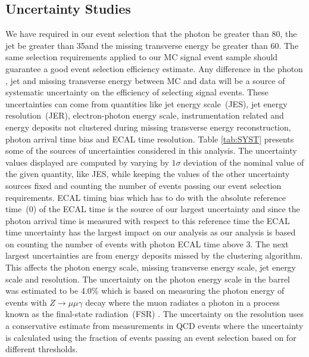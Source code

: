 \subsection{Uncertainty Studies}
We have required in our event selection that the photon \pt be greater than 80\GeVc, the jet \pt be greater than 35\GeVc and the missing transverse energy be greater than 60\GeV. The same selection requirements applied to our MC signal event sample should guarantee a good event selection efficiency estimate. Any difference in the photon \pt, jet \pt and missing transverse energy between MC and data will be a source of systematic uncertainty on the efficiency of selecting signal events. These uncertainties can come from quantities like jet energy scale~(JES), jet energy resolution~(JER), electron-photon energy scale, instrumentation related and energy deposits not clustered during missing transverse energy reconstruction, photon arrival time bias and ECAL time resolution. 
\newline
Table \ref{tab:SYST} presents some of the sources of uncertainties considered in this analysis. The uncertainty values displayed are computed by varying by $1\sigma$ deviation of the nominal value of the given quantity, like JES, while keeping the values of the other uncertainty sources fixed and counting the number of events passing our event selection requirements. ECAL timing bias which has to do with the absolute reference time~(0\ns) of the ECAL time is the source of our largest uncertainty and since the photon arrival time is measured with respect to this reference time the ECAL time uncertainty has the largest impact on our analysis as our analysis is based on counting the number of events with photon ECAL time above $3$\ns. The next largest uncertainties are from energy deposits missed by the clustering algorithm. This affects the photon energy scale, missing transverse energy scale, jet energy scale and resolution.
The uncertainty on the photon energy scale in the barrel was estimated to be 4.0\%  which is based on measuring the photon energy of events with $Z\rightarrow \mu\mu\gamma$ decay where the muon radiates a photon in a process known as the final-state radiation~(FSR) \cite{PES}.  
\newline
The uncertainty on the \MET resolution uses a conservative estimate from \MET measurements in QCD events \cite{JES,METRES} where the \MET uncertainty is calculated using the fraction of events passing an event selection based on \MET for different \MET thresholds. 
\newline
